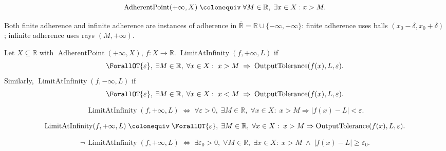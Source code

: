 \begin{remark*}
\[
  \operatorname{AdherentPoint}(+\infty,X)
  \;\colonequiv\;
  \forall M\in\mathbb{R},\;\exists x\in X:x>M.
\]
\end{remark*}

\begin{remark*}[Interpretation]
Both finite adherence and infinite adherence are instances of
adherence in $\overline{\mathbb{R}}=\mathbb{R}\cup\{-\infty,+\infty\}$:
finite adherence uses balls $(x_0-\delta,x_0+\delta)$; infinite
adherence uses rays $(M,+\infty)$.
\end{remark*}


\begin{tcolorbox}[title={Definition --- Limit at Infinity}]
\begin{definition}
\label{def:limit-at-infinity}
Let $X\subseteq\mathbb{R}$ with $\operatorname{AdherentPoint}(+\infty,X)$,
$f:X\to\mathbb{R}$.
$\operatorname{LimitAtInfinity}(f,+\infty,L)$ if
\[
  \ForallOT{\varepsilon},\;
  \exists M\in\mathbb{R},\;
  \forall x\in X:\;
  x>M \;\Rightarrow\; \operatorname{OutputTolerance}(f(x),L,\varepsilon).
\]
Similarly, $\operatorname{LimitAtInfinity}(f,-\infty,L)$ if
\[
  \ForallOT{\varepsilon},\;
  \exists M\in\mathbb{R},\;
  \forall x\in X:\;
  x<M \;\Rightarrow\; \operatorname{OutputTolerance}(f(x),L,\varepsilon).
\]
\end{definition}
\end{tcolorbox}

\begin{remark*}
\[
  \operatorname{LimitAtInfinity}(f,+\infty,L)
  \;\iff\;
  \forall\varepsilon>0,\;\exists M\in\mathbb{R},\;\forall x\in X:\;
  x>M \Rightarrow |f(x)-L|<\varepsilon.
\]
\end{remark*}

\begin{remark*}
\[
  \operatorname{LimitAtInfinity}(f,+\infty,L)
  \;\colonequiv\;
  \ForallOT{\varepsilon},\;
  \exists M\in\mathbb{R},\;
  \forall x\in X:\;
  x>M \Rightarrow \operatorname{OutputTolerance}(f(x),L,\varepsilon).
\]
\end{remark*}

\begin{remark*}
\[
  \neg\,\operatorname{LimitAtInfinity}(f,+\infty,L)
  \;\iff\;
  \exists\varepsilon_0>0,\;\forall M\in\mathbb{R},\;\exists x\in X:\;
  x>M \;\wedge\; |f(x)-L|\geq\varepsilon_0.
\]
\end{remark*}

